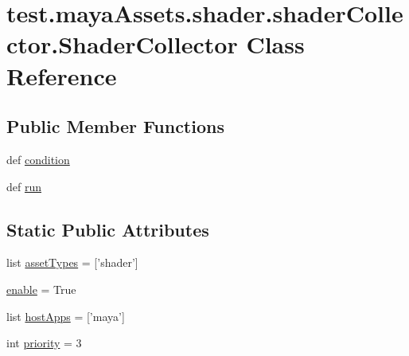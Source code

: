 \hypertarget{classtest_1_1mayaAssets_1_1shader_1_1shaderCollector_1_1ShaderCollector}{\section{test.\-maya\-Assets.\-shader.\-shader\-Collector.\-Shader\-Collector \-Class \-Reference}
\label{d9/d12/classtest_1_1mayaAssets_1_1shader_1_1shaderCollector_1_1ShaderCollector}
}
\subsection*{\-Public \-Member \-Functions}
\begin{DoxyCompactItemize}
\item 
def \hyperlink{classtest_1_1mayaAssets_1_1shader_1_1shaderCollector_1_1ShaderCollector_afe2200157593b0bcfc66631a4642ca13}{condition}
\item 
def \hyperlink{classtest_1_1mayaAssets_1_1shader_1_1shaderCollector_1_1ShaderCollector_a7a6813899955900d944d6e69ed6b417b}{run}
\end{DoxyCompactItemize}
\subsection*{\-Static \-Public \-Attributes}
\begin{DoxyCompactItemize}
\item 
list \hyperlink{classtest_1_1mayaAssets_1_1shader_1_1shaderCollector_1_1ShaderCollector_aad5562ced45f23f687bd7ce89b316d3b}{asset\-Types} = \mbox{[}'shader'\mbox{]}
\item 
\hyperlink{classtest_1_1mayaAssets_1_1shader_1_1shaderCollector_1_1ShaderCollector_a93e19cce07b947bce25687b91bdd7717}{enable} = \-True
\item 
list \hyperlink{classtest_1_1mayaAssets_1_1shader_1_1shaderCollector_1_1ShaderCollector_a6ff794a6d041c3d0b1d8ceb7175723c1}{host\-Apps} = \mbox{[}'maya'\mbox{]}
\item 
int \hyperlink{classtest_1_1mayaAssets_1_1shader_1_1shaderCollector_1_1ShaderCollector_a2a62ad7ceb3d80d16a917d3177343756}{priority} = 3
\end{DoxyCompactItemize}


